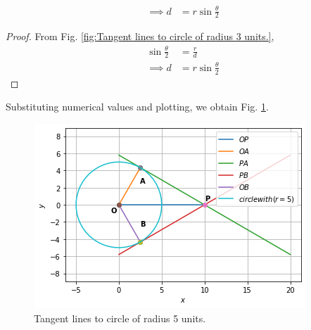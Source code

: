 \begin{enumerate}[label=\thesubsection.\arabic*.,ref=\thesubsection.\theenumi]
\begin{lemma}
  \begin{align}
    \implies d &= r\sin \frac{\theta}{2}
  \end{align}
%  
\end{lemma}
\begin{proof}
  From Fig.  \ref{fig:Tangent lines to circle of radius 3 units.},
\begin{align}
  \sin \frac{\theta}{2} &= \frac{r}{d}
  \\
  \implies d &= r\sin \frac{\theta}{2}
\end{align}
\end{proof}
Substituting numerical values and plotting, we obtain Fig. \ref{fig:Tangent lines to circle of radius 5 units.}.
%
\begin{figure}[ht]
  \centering
  \includegraphics[width=\columnwidth]{solutions/su2021/circle/2/58/download.png}
  \caption{Tangent lines to circle of radius 5 units.}
  \label{fig:Tangent lines to circle of radius 5 units.}
\end{figure}   

\end{enumerate}
